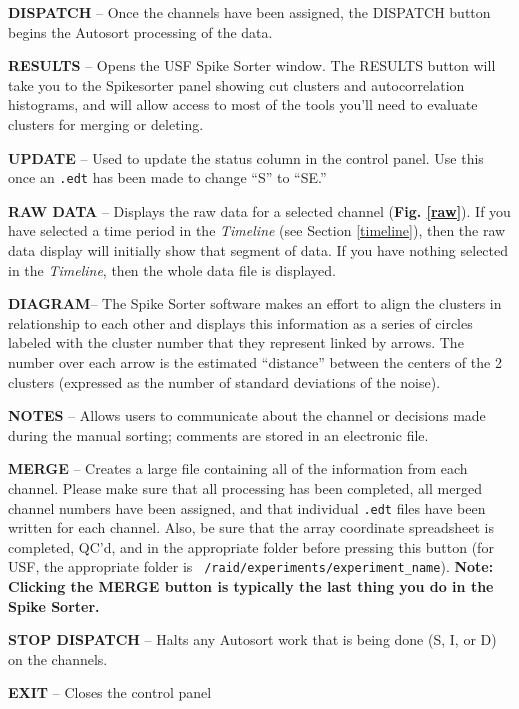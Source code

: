 \documentclass[12pt]{article}
\begin{document}
\begin{description}
\item \textbf{\textsf{DISPATCH}} -- Once the channels have been
  assigned, the {\sf DISPATCH} button begins the Autosort processing
  of the data.
\item \textbf{\textsf{RESULTS}} -- Opens the USF Spike Sorter
  window.\textsf{\textcolor{black}{ }}The \textsf{RESULTS} button will
  take you to the \textsf{Spikesorter} panel showing cut clusters and
  autocorrelation histograms, and will allow access to most of the
  tools you'll need to evaluate clusters for merging or deleting.
\item \textbf{\textsf{UPDATE}} -- Used to update the status column in
  the control panel. Use this once an {\tt *.edt} has been made to
  change ``S'' to ``SE.''
\item \textbf{\textsf{RAW DATA}} -- Displays the raw data for a
  selected channel (\textbf{Fig. \ref{raw}}). If you have selected a
  time period in the \textit{Timeline} (see Section \ref{timeline}),
  then the raw data display will initially show that segment of
  data. If you have nothing selected in the \textit{Timeline}, then
  the whole data file is displayed.
\item \textbf{\textsf{DIAGRAM}}-- The Spike Sorter software makes an
  effort to align the clusters in relationship to each other and
  displays this information as a series of circles labeled with the
  cluster number that they represent linked by arrows.  The number
  over each arrow is the estimated ``distance'' between the centers of
  the 2 clusters (expressed as the number of standard deviations of
  the noise).
\item \textbf{\textsf{NOTES}} -- Allows users to communicate about the
  channel or decisions made during the manual sorting; comments are
  stored in an electronic file.
\item \textbf{\textsf{MERGE}} -- Creates a large file containing all
  of the information from each channel. Please make sure that all
  processing has been completed, all merged channel numbers have been
  assigned, and that individual {\tt *.edt} files have been written
  for each channel.  Also, be sure that the array coordinate
  spreadsheet is completed, QC'd, and in the appropriate folder before
  pressing this button (for USF, the appropriate folder is {\tt
    /raid/experiments/experiment\_name}). \textbf{Note: Clicking the
    {\sf MERGE} button is typically the last thing you do in the Spike
    Sorter.}
\item \textbf{\textsf{STOP DISPATCH}} -- Halts any Autosort work that
  is being done (S, I, or D) on the channels.
\item \textbf{\textsf{EXIT}} -- Closes the control panel
\end{description}
\end{document}
